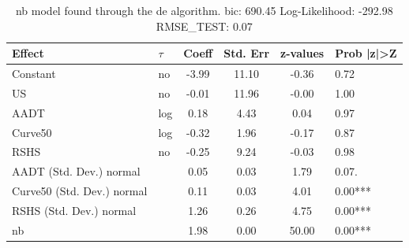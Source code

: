 \begin{table}
	\caption{nb model found through the de algorithm. bic: 690.45 Log-Likelihood: -292.98 RMSE_TEST: 0.07}
	\begin{center}
		\begin{tabular}{|l|l|c|c|c|l|}
			\hline
			Effect & $\tau$ & Coeff & Std. Err & z-values & Prob |z|>Z \\
			\hline
			Constant & no & -3.99 & 11.10 & -0.36 & 0.72 \\
			\hline
			US & no & -0.01 & 11.96 & -0.00 & 1.00 \\
			\hline
			AADT & log & 0.18 & 4.43 & 0.04 & 0.97 \\
			\hline
			Curve50 & log & -0.32 & 1.96 & -0.17 & 0.87 \\
			\hline
			RSHS & no & -0.25 & 9.24 & -0.03 & 0.98 \\
			\hline
			AADT (Std. Dev.) normal &  & 0.05 & 0.03 & 1.79 & 0.07. \\
			\hline
			Curve50 (Std. Dev.) normal &  & 0.11 & 0.03 & 4.01 & 0.00*** \\
			\hline
			RSHS (Std. Dev.) normal &  & 1.26 & 0.26 & 4.75 & 0.00*** \\
			\hline
			nb &  & 1.98 & 0.00 & 50.00 & 0.00*** \\
			\hline
		\end{tabular}
	\end{center}
\end{table}